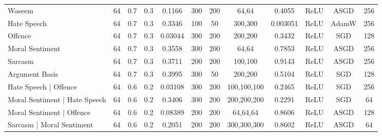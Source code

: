 {\begin{landscape}
\begin{table}[]
{\begin{tabular}{l|ccccccccccc}
      Waseem                                                             & 64         & 0.7              & 0.3              & 0.1166  & 300           & 200    & 64,64                   & 0.4055        & ReLU          & ASGD      & 256        \\
      Hate Speech                                                        & 64         & 0.7              & 0.3              & 0.3346  & 100           & 50     & 300,300                 & 0.003051      & ReLU          & AdamW     & 256        \\
      Offence                                                            & 64         & 0.7              & 0.3              & 0.03044 & 300           & 200    & 200,200                 & 0.3432        & ReLU          & SGD       & 128        \\
      Moral Sentiment                                                    & 64         & 0.7              & 0.3              & 0.3558  & 300           & 200    & 64,64                   & 0.7853        & ReLU          & ASGD      & 256        \\
      Sarcasm                                                            & 64         & 0.7              & 0.3              & 0.3711  & 200           & 200    & 100,100                 & 0.9143        & ReLU          & ASGD      & 256        \\
      Argument Basis                                                     & 64         & 0.7              & 0.3              & 0.3995  & 300           & 50     & 200,200                 & 0.5104        & ReLU          & SGD       & 128        \\ \hline
      Hate Speech | Offence                                              & 64         & 0.6              & 0.2              & 0.03108 & 300           & 200    & 100,100,100             & 0.2465        & ReLU          & SGD       & 256        \\
      Moral Sentiment | Hate Speech                                      & 64         & 0.6              & 0.2              & 0.3406  & 300           & 200    & 200,200,200             & 0.2291        & ReLU          & SGD       & 64         \\
      Moral Sentiment | Offence                                          & 64         & 0.6              & 0.2              & 0.08389 & 200           & 200    & 64,64,64                & 0.8606        & ReLU          & ASGD      & 128        \\
      Sarcasm | Moral Sentiment                                          & 64         & 0.6              & 0.2              & 0.2051  & 200           & 200    & 300,300,300             & 0.8602        & ReLU          & ASGD      & 64         \\

\end{tabular}}
\end{table}
\end{landscape}}

